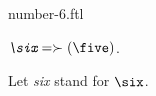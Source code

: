 \documentclass{stex}
\begin{document}
\begin{smodule}{number-6.ftl}



\begin{definition}[forthel,id=SixDef]
  $\emph{\six} = \succ(\five)$.

  Let \emph{six} stand for $\six$.
\end{definition}

\end{smodule}
\end{document}
